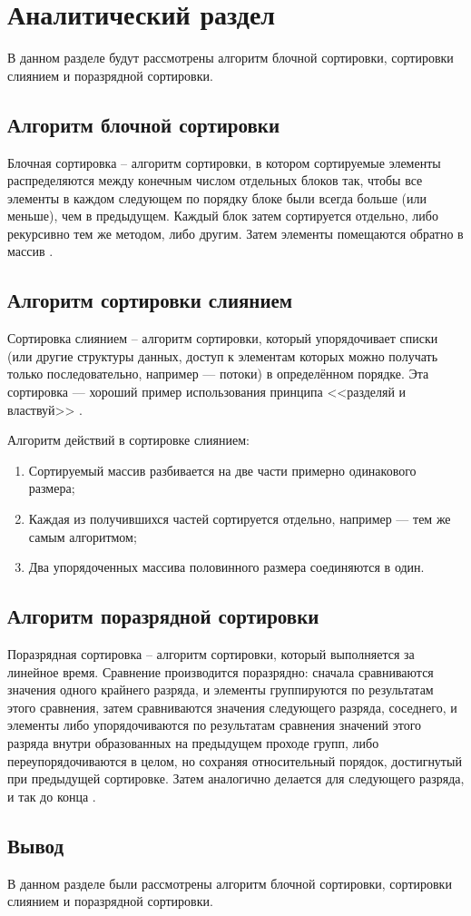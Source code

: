 \chapter{Аналитический раздел}

В данном разделе будут рассмотрены алгоритм блочной сортировки, сортировки слиянием и поразрядной сортировки.

\section{Алгоритм блочной сортировки}

Блочная сортировка -- алгоритм сортировки, в котором сортируемые элементы распределяются между конечным числом отдельных блоков так, чтобы все элементы в каждом следующем по порядку блоке были всегда больше (или меньше), чем в предыдущем. Каждый блок затем сортируется отдельно, либо рекурсивно тем же методом, либо другим. Затем элементы помещаются обратно в массив \cite{bucket_wiki}. 


\section{Алгоритм сортировки слиянием}

Сортировка слиянием -- алгоритм сортировки, который упорядочивает списки (или другие структуры данных, доступ к элементам которых можно получать только последовательно, например — потоки) в определённом порядке. Эта сортировка — хороший пример использования принципа <<разделяй и властвуй>> \cite{merge_wiki}.

Алгоритм действий в сортировке слиянием:

\begin{enumerate}[label={\arabic*)}]
	\item Сортируемый массив разбивается на две части примерно одинакового размера;
	\item Каждая из получившихся частей сортируется отдельно, например — тем же самым алгоритмом;
	\item Два упорядоченных массива половинного размера соединяются в один.
\end{enumerate}


\section{Алгоритм поразрядной сортировки}

Поразрядная сортировка -- алгоритм сортировки, который выполняется за линейное время. Сравнение производится поразрядно: сначала сравниваются значения одного крайнего разряда, и элементы группируются по результатам этого сравнения, затем сравниваются значения следующего разряда, соседнего, и элементы либо упорядочиваются по результатам сравнения значений этого разряда внутри образованных на предыдущем проходе групп, либо переупорядочиваются в целом, но сохраняя относительный порядок, достигнутый при предыдущей сортировке. Затем аналогично делается для следующего разряда, и так до конца \cite{radix_wiki}.

\section*{Вывод}

В данном разделе были рассмотрены алгоритм блочной сортировки, сортировки слиянием и поразрядной сортировки.
